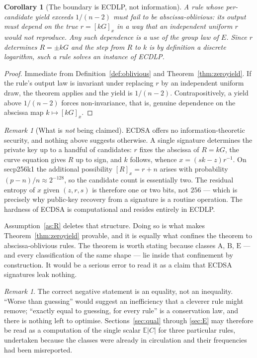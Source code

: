 \documentclass[11pt,a4paper]{article}
\theoremstyle{plain}
\newtheorem{corollary}[theorem]{Corollary}
\theoremstyle{definition}
\theoremstyle{remark}
\newtheorem{remark}[theorem]{Remark}
\newcommand{\Ex}{\mathbb{E}}
\newcommand{\clA}{\mathrm{A}}
\newcommand{\clB}{\mathrm{B}}
\newcommand{\clE}{\mathrm{E}}
\begin{document}
\begin{corollary}[The boundary is ECDLP, not information]\label{cor:ecdlp}
A rule whose per-candidate yield exceeds $1/(n-2)$ must fail to be abscissa-oblivious: its output
must depend on the true $r = [kG]_x$ in a way that an independent uniform $r$ would not reproduce.
Any such dependence is a use of the group law of $E$. Since $r$ determines $R = \pm kG$ and the
step from $R$ to $k$ is by definition a discrete logarithm, such a rule solves an instance of
ECDLP.
\end{corollary}

\begin{proof}
Immediate from Definition~\ref{def:oblivious} and Theorem~\ref{thm:zeroyield}. If the rule's
output law is invariant under replacing $r$ by an independent uniform draw, the theorem applies
and the yield is $1/(n-2)$. Contrapositively, a yield above $1/(n-2)$ forces non-invariance, that
is, genuine dependence on the abscissa map $k \mapsto [kG]_x$.
\end{proof}

\begin{remark}[What is \emph{not} being claimed]\label{rem:notIT}
ECDSA offers no information-theoretic security, and nothing above suggests otherwise. A single
signature determines the private key up to a handful of candidates: $r$ fixes the abscissa of
$R = kG$, the curve equation gives $R$ up to sign, and $k$ follows, whence
$x = (sk-z)r^{-1}$. On secp256k1 the additional possibility $[R]_x = r+n$ arises with probability
$(p-n)/n \approx 2^{-128}$, so the candidate count is essentially two. The residual entropy of $x$
given $(z,r,s)$ is therefore one or two bits, not $256$ --- which is precisely why public-key
recovery from a signature is a routine operation. The hardness of ECDSA is computational and
resides entirely in ECDLP.

Assumption~\ref{as:R} deletes that structure. Doing so is what makes
Theorem~\ref{thm:zeroyield} provable, and it is equally what confines the theorem to
abscissa-oblivious rules. The theorem is worth stating because classes $\clA$, $\clB$, $\clE$ ---
and every classification of the same shape --- lie inside that confinement by construction. It
would be a serious error to read it as a claim that ECDSA signatures leak nothing.
\end{remark}

\begin{remark}\label{rem:framing}
The correct negative statement is an equality, not an inequality. ``Worse than guessing'' would
suggest an inefficiency that a cleverer rule might remove; ``exactly equal to guessing, for every
rule'' is a conservation law, and there is nothing left to optimise. Sections~\ref{sec:qual}
through \ref{sec:E} may therefore be read as a computation of the single scalar $\Ex|C|$ for three
particular rules, undertaken because the classes were already in circulation and their frequencies
had been misreported.
\end{remark}
\end{document}
